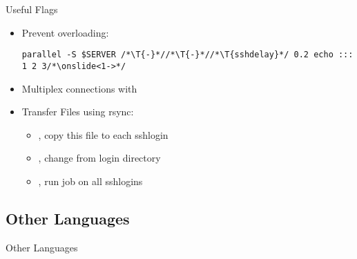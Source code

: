 {
\begin{frame}[fragile]{Useful Flags}
\begin{itemize}[<+(1)->]
   \itemsep12pt
   \item Prevent  overloading:\pause
\begin{verbatim}
parallel -S $SERVER /*\T{-}*//*\T{-}*//*\T{sshdelay}*/ 0.2 echo ::: 1 2 3/*\onslide<1->*/
\end{verbatim}
   \item Multiplex connections with 
   \item Transfer Files using rsync: \begin{itemize}
      \item {}, copy this file to each sshlogin %
      \item {}, change from login directory
      \item {}, run job on all sshlogins %
   \end{itemize}
\end{itemize}
\end{frame}
\SidebarReset

\subsection{Other Languages}
\begin{frame}[fragile]{Other Languages}
\begin{layout-imageonly}%
\end{layout-imageonly}
\end{frame}}
